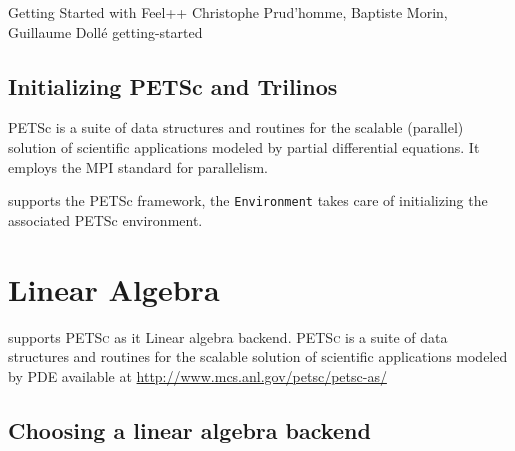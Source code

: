             {Getting Started with Feel++}
            {Christophe Prud'homme, Baptiste Morin, Guillaume Dollé}
            {getting-started}





\subsection{Initializing PETSc and Trilinos}


PETSc is a suite of data structures and routines for the scalable (parallel)
solution of scientific applications modeled by partial differential
equations. It employs the MPI standard for parallelism.

\feel supports the PETSc framework, the \lstinline!Environment! 
takes care of initializing the associated PETSc environment.












\section{Linear Algebra}
\label{sec:linear-algebra}

\feel supports \textsc{PETSc} as it Linear algebra backend. \textsc{PETSc} is a
suite of data structures and routines for the scalable solution of scientific
applications modeled by PDE available at
\url{http://www.mcs.anl.gov/petsc/petsc-as/}



\subsection{Choosing a linear algebra backend}
\label{sec:choos-line-algebra}

